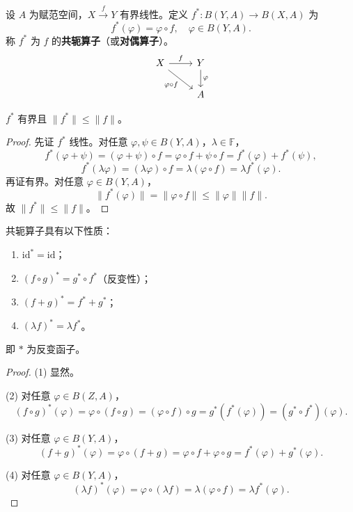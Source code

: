 \documentclass[lang=cn,a4paper,newtx,section]{elegantbook}
\begin{document}
\begin{definition}[共轭算子]
  设 $A$ 为赋范空间，$X\xrightarrow{f}Y$ 有界线性。定义 $f^*:B(Y,A)\to B(X,A)$ 为
  \[
    f^*(\varphi)=\varphi\circ f,\quad\varphi\in B(Y,A).
  \]
  称 $f^*$ 为 $f$ 的\textbf{共轭算子}（或\textbf{对偶算子}）。
  \[
    \begin{tikzcd}
      X \arrow[r,"f"] \arrow[dr,"\varphi\circ f"'] & Y \arrow[d,"\varphi"] \\
      & A
    \end{tikzcd}
  \]
\end{definition}

\begin{proposition}
  $f^*$ 有界且 $\|f^*\|\le\|f\|$。
\end{proposition}

\begin{proof}
  先证 $f^*$ 线性。对任意 $\varphi,\psi\in B(Y,A)$，$\lambda\in\mathbb{F}$，
  \[
    f^*(\varphi+\psi)=(\varphi+\psi)\circ f=\varphi\circ f+\psi\circ f=f^*(\varphi)+f^*(\psi),
  \]
  \[
    f^*(\lambda\varphi)=(\lambda\varphi)\circ f=\lambda(\varphi\circ f)=\lambda f^*(\varphi).
  \]
  再证有界。对任意 $\varphi\in B(Y,A)$，
  \[
    \|f^*(\varphi)\|=\|\varphi\circ f\|\le\|\varphi\|\|f\|.
  \]
  故 $\|f^*\|\le\|f\|$。
\end{proof}

\begin{proposition}
  共轭算子具有以下性质：
  \begin{enumerate}
    \item $\mathrm{id}^*=\mathrm{id}$；
    \item $(f\circ g)^*=g^*\circ f^*$（反变性）；
    \item $(f+g)^*=f^*+g^*$；
    \item $(\lambda f)^*=\lambda f^*$。
  \end{enumerate}
  即 $*$ 为反变函子。
\end{proposition}

\begin{proof}
  (1) 显然。

  (2) 对任意 $\varphi\in B(Z,A)$，
  \[
    (f\circ g)^*(\varphi)=\varphi\circ(f\circ g)=(\varphi\circ f)\circ g=g^*(f^*(\varphi))=(g^*\circ f^*)(\varphi).
  \]

  (3) 对任意 $\varphi\in B(Y,A)$，
  \[
    (f+g)^*(\varphi)=\varphi\circ(f+g)=\varphi\circ f+\varphi\circ g=f^*(\varphi)+g^*(\varphi).
  \]

  (4) 对任意 $\varphi\in B(Y,A)$，
  \[
    (\lambda f)^*(\varphi)=\varphi\circ(\lambda f)=\lambda(\varphi\circ f)=\lambda f^*(\varphi).
  \]
\end{proof}
\end{document}
